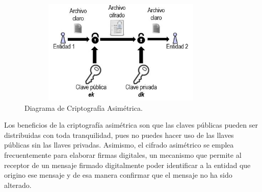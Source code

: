 \begin{figure}[H]
\centering
\includegraphics[width=10cm, height=5cm]{./images/Cripto_Asimetrica.jpg}
\caption{Diagrama de Criptografía Asimétrica.}
\label{fig:2-4-1}
\end{figure}

Los beneficios de la criptografía asimétrica son que las claves públicas pueden ser distribuidas con toda tranquilidad, pues no puedes hacer uso de las llaves públicas sin las llaves privadas. Asimismo, el cifrado asimétrico se emplea frecuentemente para elaborar firmas digitales, un mecanismo que permite al receptor de un mensaje firmado digitalmente poder identificar a la entidad que origino ese mensaje y de esa manera confirmar que el mensaje no ha sido alterado. \\



